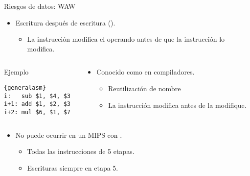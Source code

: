 \begin{frame}[t,fragile]{Riesgos de datos: WAW}
\begin{itemize}
  \item Escritura después de escritura ().
    \begin{itemize}
      \item La instrucción  modifica el operando antes de que la
            instrucción  lo modifica.
    \end{itemize}
\end{itemize}
\begin{columns}
\begin{column}{.25\textwidth}
\begin{block}{Ejemplo}
\begin{lstlisting}{generalasm}
i:   sub $1, $4, $3
i+1: add $1, $2, $3
i+2: mul $6, $1, $7
\end{lstlisting}
\end{block}
\end{column}
\begin{column}{.75\textwidth}
\begin{itemize}
  \item Conocido como  en compiladores.
    \begin{itemize}
      \item Reutilización de nombre
      \item La instrucción  modifica 
            antes de  la modifique.
    \end{itemize}
\end{itemize}
\end{column}
\end{columns}
\begin{itemize}
  \item \alert{No puede} ocurrir en un MIPS con .
  \begin{itemize}
    \item Todas las instrucciones de 5 etapas.
    \item Escrituras siempre en etapa 5.
  \end{itemize}
\end{itemize}
\end{frame}


